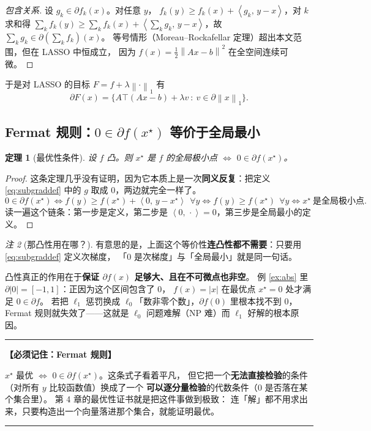 \documentclass[11pt,a4paper,UTF8]{ctexart}
\theoremstyle{plain}
\newtheorem{theorem}{定理}[section]
\theoremstyle{definition}
\theoremstyle{remark}
\newtheorem{remark}[theorem]{注}
\newcommand{\norm}[1]{\left\lVert #1 \right\rVert}
\newcommand{\abs}[1]{\left\lvert #1 \right\rvert}
\newcommand{\inner}[2]{\left\langle #1,\, #2 \right\rangle}
\newenvironment{keypoint}[1]
  {\par\medskip\noindent\begin{minipage}{\linewidth}%
   \hrule\smallskip\noindent\textbf{【必须记住：#1】}\par\nopagebreak\smallskip}
  {\smallskip\hrule\end{minipage}\medskip}
\begin{document}
\begin{proof}[包含关系]
设 $g_k\in\partial f_k(x)$。对任意 $y$，
$f_k(y)\ge f_k(x)+\inner{g_k}{y-x}$，对 $k$ 求和得
$\sum_kf_k(y)\ge\sum_kf_k(x)+\inner{\sum_kg_k}{y-x}$，故 $\sum_kg_k\in\partial(\sum_kf_k)(x)$。
等号情形（Moreau--Rockafellar 定理）超出本文范围，但在 LASSO 中恒成立，
因为 $f(x)=\tfrac12\norm{Ax-b}^2$ 在全空间连续可微。
\end{proof}

于是对 LASSO 的目标 $F=f+\lambda\norm{\cdot}_1$ 有
\begin{equation}
\partial F(x)=\bigl\{A\top(Ax-b)+\lambda v\ :\ v\in\partial\norm{x}_1\bigr\}.
\label{eq:lassoSub}
\end{equation}

\subsection{Fermat 规则：$0\in\partial f(x^\star)$ 等价于全局最小}

\begin{theorem}[最优性条件]\label{thm:fermat}
设 $f$ 凸。则 $x^\star$ 是 $f$ 的全局极小点 $\iff$ $0\in\partial f(x^\star)$。
\end{theorem}

\begin{proof}
这条定理几乎没有证明，因为它本质上是一次\textbf{同义反复}：把定义 \eqref{eq:subgraddef} 中的
$g$ 取成 $0$，两边就完全一样了。
\[
0\in\partial f(x^\star)
\iff f(y)\ge f(x^\star)+\inner{0}{y-x^\star}\ \ \forall y
\iff f(y)\ge f(x^\star)\ \ \forall y
\iff x^\star\ \text{是全局极小点}.
\]
读一遍这个链条：第一步是定义，第二步是 $\inner{0}{\cdot}=0$，第三步是全局最小的定义。
\end{proof}

\begin{remark}[那凸性用在哪？]
有意思的是，上面这个等价性\textbf{连凸性都不需要}：只要用 \eqref{eq:subgraddef} 定义次梯度，
「$0$ 是次梯度」与「全局最小」就是同一句话。

凸性真正的作用在于\textbf{保证 $\partial f(x)$ 足够大、且在不可微点也非空}。
例 \ref{ex:abs} 里 $\partial\abs{0}=[-1,1]$：正因为这个区间包含了 $0$，
$f(x)=\abs{x}$ 在最优点 $x^\star=0$ 处才满足 $0\in\partial f$。
若把 $\ell_1$ 惩罚换成 $\ell_0$「数非零个数」，$\partial f(0)$ 里根本找不到 $0$，
Fermat 规则就失效了——这就是 $\ell_0$ 问题难解（NP 难）而 $\ell_1$ 好解的根本原因。
\end{remark}

\begin{keypoint}{Fermat 规则}
$x^\star$ 最优 $\iff$ $0\in\partial f(x^\star)$。这条式子看着平凡，
但它把一个\textbf{无法直接检验}的条件（对所有 $y$ 比较函数值）换成了一个
\textbf{可以逐分量检验}的代数条件（$0$ 是否落在某个集合里）。
第 4 章的最优性证书就是把这件事做到极致：
连「解」都不用求出来，只要构造出一个向量落进那个集合，就能证明最优。
\end{keypoint}
\end{document}
